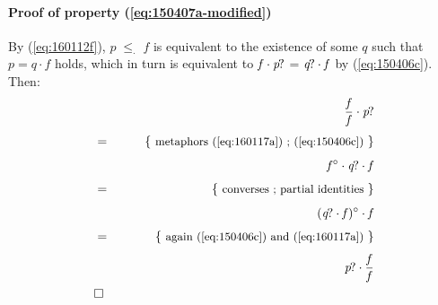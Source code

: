 \documentclass{elsarticle}
\newcommand{\Varid}[1]{\mathit{#1}}
\renewcommand{\leq}{\leqslant}
\def\comp{ \mathbin{\cdot} }
\def\conv#1{#1^\circ}
\def\just#1#2{\\ &#1& \rule{2em}{0pt} \{ \mbox{\rule[-.7em]{0pt}{1.8em} \small #2 \/} \} \nonumber\\ && }
\def\qed{\\&\Box&\nonumber}
\def\start{&&}
\begin{document}
\paragraph{Proof of property (\ref{eq:150407a-modified})}
By (\ref{eq:160112f}), \ensuremath{\Varid{p}\;{\leq_{\cdot }}\;\Varid{f}} is equivalent to the
existence of some \ensuremath{\Varid{q}} such that \ensuremath{\Varid{p}\mathrel{=}\Varid{q} \comp \Varid{f}} holds, which in turn is equivalent to
\ensuremath{\Varid{f} \comp \Varid{p}\hskip-1pt\mathit{?}} = \ensuremath{\Varid{q}\hskip-1pt\mathit{?} \comp \Varid{f}} by (\ref{eq:150406c}). Then:
\begin{eqnarray*}
\start
	\ensuremath{\frac{\Varid{f}}{\Varid{f}} \comp \Varid{p}\hskip-1pt\mathit{?}}
%
\just={ metaphors (\ref{eq:160117a}) ; (\ref{eq:150406c}) }
%
	\ensuremath{\conv{\Varid{f}} \comp \Varid{q}\hskip-1pt\mathit{?} \comp \Varid{f}}
%
\just={ converses ; partial identities }
%
	\ensuremath{\conv{(\Varid{q}\hskip-1pt\mathit{?} \comp \Varid{f})} \comp \Varid{f}}
%
\just={ again (\ref{eq:150406c}) and (\ref{eq:160117a}) }
%
	\ensuremath{\Varid{p}\hskip-1pt\mathit{?} \comp \frac{\Varid{f}}{\Varid{f}}}
\qed
\end{eqnarray*}
\end{document}
